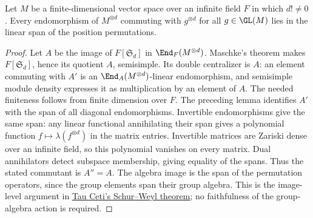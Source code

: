 \begin{lemma}
\label{lem:schur-weyl-permutation-span}
\leanok
Let $M$ be a finite-dimensional vector space over an infinite field $F$
in which $d!\ne0$. Every endomorphism of $M^{\otimes d}$ commuting
with $g^{\otimes d}$ for all $g\in\GL(M)$ lies in the linear span of
the position permutations.
\end{lemma}
\begin{proof}
Let $A$ be the image of $F[\mathfrak S_d]$ in $\End_F(M^{\otimes d})$.
Maschke's theorem makes $F[\mathfrak S_d]$, hence its quotient $A$,
semisimple. Its double centralizer is $A$: an element commuting with
$A'$ is an $\End_A(M^{\otimes d})$-linear endomorphism, and semisimple
module density expresses it as multiplication by an element of $A$.
The needed finiteness follows from finite dimension over $F$.
The preceding lemma identifies $A'$ with the span of all diagonal
endomorphisms. Invertible endomorphisms give the same span: any linear
functional annihilating their span gives a polynomial function
$f\mapsto\lambda(f^{\otimes d})$ in the matrix entries. Invertible matrices
are Zariski dense over an infinite field, so this polynomial vanishes on
every matrix. Dual annihilators detect subspace membership, giving equality
of the spans. Thus the stated commutant is $A''=A$.
The algebra image is the span of the permutation operators, since the
group elements span their group algebra. This is the image-level argument
in \href{https://github.com/TauCetiProject/TauCeti/blob/b3b0334ab9203d9faee4b2f34cd75161463ecdd0/TauCeti/RepresentationTheory/Symmetric/TensorAction/SchurWeyl.lean}{Tau Ceti's Schur--Weyl theorem}; no faithfulness of the group-algebra action is required.
\end{proof}

